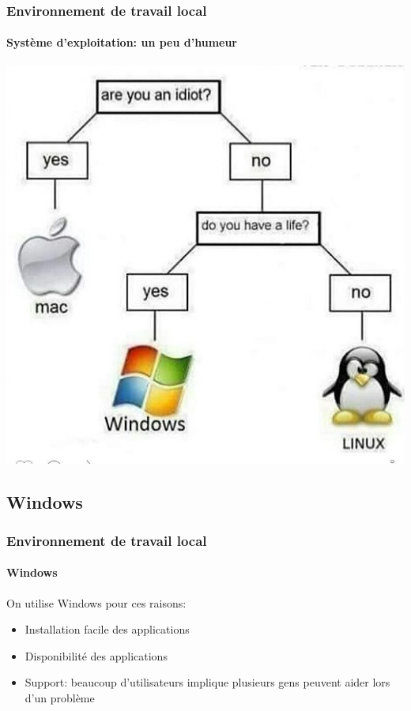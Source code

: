 \documentclass[xcolor=table]{beamer}
\begin{document}
\begin{frame}
\frametitle{Environnement de travail local}
\framesubtitle{Système d'exploitation: un peu d'humeur}

\begin{center}
	\includegraphics[height=
	.8\textheight]{../img/Bweb01-environnement/os-humour.jpg}
\end{center}

\end{frame}

\subsection{Windows}

\begin{frame}
\frametitle{Environnement de travail local}
\framesubtitle{Windows}

On utilise Windows pour ces raisons:
\begin{itemize}
	\item Installation facile des applications
	\item Disponibilité des applications 
	\item Support: beaucoup d'utilisateurs implique plusieurs gens peuvent aider lors d'un problème
\end{itemize}

\end{frame}
\end{document}
